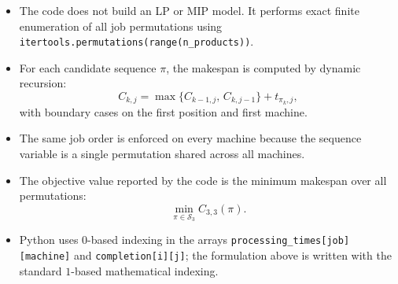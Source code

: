 \begin{itemize}
    \item The code does not build an LP or MIP model. It performs exact finite enumeration of all job permutations using \texttt{itertools.permutations(range(n\_products))}.
    \item For each candidate sequence $\pi$, the makespan is computed by dynamic recursion:
    \[
    C_{k,j} = \max\{C_{k-1,j},\, C_{k,j-1}\} + t_{\pi_k,j},
    \]
    with boundary cases on the first position and first machine.
    \item The same job order is enforced on every machine because the sequence variable is a single permutation shared across all machines.
    \item The objective value reported by the code is the minimum makespan over all permutations:
    \[
    \min_{\pi \in \mathcal{S}_3} C_{3,3}(\pi).
    \]
    \item Python uses $0$-based indexing in the arrays \texttt{processing\_times[job][machine]} and \texttt{completion[i][j]}; the formulation above is written with the standard $1$-based mathematical indexing.
\end{itemize}
